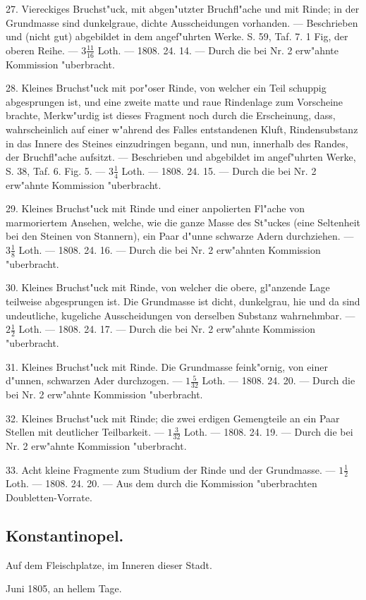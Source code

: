 \documentclass[a4paper, 11pt, oneside, polutonikogreek, german]{article}
\begin{document}
27. Viereckiges Bruchst"uck, mit abgen"utzter Bruchfl"ache und mit Rinde; in der Grundmasse sind dunkelgraue, dichte Ausscheidungen vorhanden. --- Beschrieben und (nicht gut) abgebildet in dem angef"uhrten Werke. S. 59, Taf. 7. 1 Fig, der oberen Reihe. --- $3\frac{11}{16}$ Loth. --- 1808. 24. 14. --- Durch die bei Nr. 2 erw"ahnte Kommission "uberbracht.

28. Kleines Bruchst"uck mit por"oser Rinde, von welcher ein Teil schuppig abgesprungen ist, und eine zweite matte und raue Rindenlage zum Vorscheine brachte, Merkw"urdig ist dieses Fragment noch durch die Erscheinung, dass, wahrscheinlich auf einer w"ahrend des Falles entstandenen Kluft, Rindensubstanz in das Innere des Steines einzudringen begann, und nun, innerhalb des Randes, der Bruchfl"ache aufsitzt. --- Beschrieben und abgebildet im angef"uhrten Werke, S. 38, Taf. 6. Fig. 5. --- $3\frac{1}{4}$ Loth. --- 1808. 24. 15. --- Durch die bei Nr. 2 erw"ahnte Kommission "uberbracht.

29. Kleines Bruchst"uck mit Rinde und einer anpolierten Fl"ache von marmoriertem Ansehen, welche, wie die ganze Masse des St"uckes (eine Seltenheit bei den Steinen von Stannern), ein Paar d"unne schwarze Adern durchziehen. --- $3\frac{1}{8}$ Loth. --- 1808. 24. 16. --- Durch die bei Nr. 2 erw"ahnten Kommission "uberbracht.

30. Kleines Bruchst"uck mit Rinde, von welcher die obere, gl"anzende Lage teilweise abgesprungen ist. Die Grundmasse ist dicht, dunkelgrau, hie und da sind undeutliche, kugeliche Ausscheidungen von derselben Substanz wahrnehmbar. --- $2\frac{1}{2}$ Loth. --- 1808. 24. 17. --- Durch die bei Nr. 2 erw"ahnte Kommission "uberbracht.

31. Kleines Bruchst"uck mit Rinde. Die Grundmasse feink"ornig, von einer d"unnen, schwarzen Ader durchzogen. --- $1\frac{5}{32}$ Loth. --- 1808. 24. 20. --- Durch die bei Nr. 2 erw"ahnte Kommission "uberbracht.

32. Kleines Bruchst"uck mit Rinde; die zwei erdigen Gemengteile an ein Paar Stellen mit deutlicher Teilbarkeit. --- $1\frac{3}{32}$ Loth. --- 1808. 24. 19. --- Durch die bei Nr. 2 erw"ahnte Kommission "uberbracht.

33. Acht kleine Fragmente zum Studium der Rinde und der Grundmasse. --- $1\frac{1}{2}$ Loth. --- 1808. 24. 20. --- Aus dem durch die Kommission "uberbrachten Doubletten-Vorrate.
\subsection{Konstantinopel.}
\begin{center}
\small
Auf dem Fleischplatze, im Inneren dieser Stadt.

Juni 1805, an hellem Tage.
\end{center}
\end{document}
